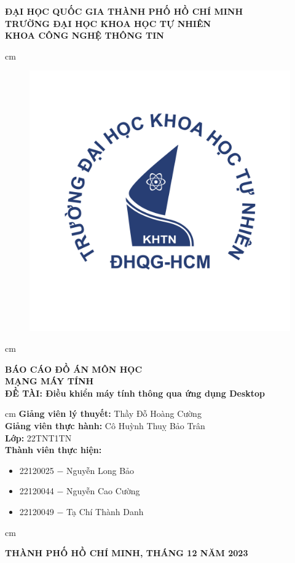 \begin{titlepage}
\begin{mybox}
\begin{center}
\fontsize{12}{12}\selectfont
\textbf{ĐẠI HỌC QUỐC GIA THÀNH PHỐ HỒ CHÍ MINH}\\
\textbf{TRƯỜNG ĐẠI HỌC KHOA HỌC TỰ NHIÊN}\\
\textbf{KHOA CÔNG NGHỆ THÔNG TIN}
\end{center}
 cm
\begin{figure}[H]
\begin{center}
\includegraphics[scale=0.25]{figures/logo}
\end{center}
\end{figure}
 cm
\begin{center}
\fontsize{18}{14}\selectfont
\textbf{BÁO CÁO ĐỒ ÁN MÔN HỌC}\\
\fontsize{26}{16}\selectfont
\textbf{MẠNG MÁY TÍNH}\\
\fontsize{18}{12}\selectfont
\textbf{ĐỀ TÀI: Điều khiển máy tính thông qua ứng dụng Desktop}
\end{center}
 cm
\fontsize{14}{12}\selectfont
\textbf{Giảng viên lý thuyết:} Thầy Đỗ Hoàng Cường\\
\textbf{Giảng viên thực hành:} Cô Huỳnh Thuỵ Bảo Trân\\
\textbf{Lớp:} 22TNT1TN\\
\textbf{Thành viên thực hiện:}
\begin{itemize}
\item 22120025 $-$ Nguyễn Long Bảo
\item 22120044 $-$ Nguyễn Cao Cường
\item 22120049 $-$ Tạ Chí Thành Danh
\end{itemize}
 cm
\begin{center}
\textbf{THÀNH PHỐ HỒ CHÍ MINH, THÁNG 12 NĂM 2023}
\end{center}
\end{mybox}
\end{titlepage}
